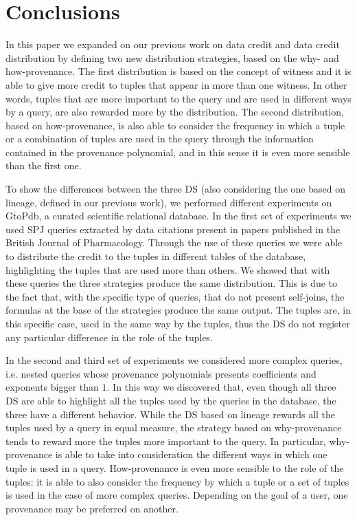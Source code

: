 \section{Conclusions}
\label{section:conclusions}

In this paper we expanded on our previous work on data credit and data credit distribution by defining two new distribution strategies, based on the why- and how-provenance. 
The first distribution is based on the concept of witness and it is able to give more credit to tuples that appear in more than one witness. 
In other words, tuples that are more important to the query and are used in different ways by a query, are also rewarded more by the distribution.
The second distribution, based on how-provenance, is also able to consider the frequency in which a tuple or a combination of tuples are used in the query through the information contained in the provenance polynomial, and in this sense it is even more sensible than the first one.

To show the differences between the three DS (also considering the one based on lineage, defined in our previous work), we performed different experiments on GtoPdb, a curated scientific relational database. 
In the first set of experiments we used SPJ queries extracted by data citations present in papers published in the British Journal of Pharmacology. 
Through the use of these queries we were able to distribute the credit to the tuples in different tables of the database, highlighting the tuples that are used more than others. 
We showed that with these queries the three strategies produce the same distribution. This is due to the fact that, with the specific type of queries, that do not present self-joins, the formulas at the base of the strategies produce the same output. The tuples are, in this specific case, used in the same way by the tuples, thus the DS do not register any particular difference in the role of the tuples.

In the second and third set of experiments we considered more complex queries, i.e. nested queries whose provenance polynomials presents coefficients and exponents bigger than $1$.
In this way we discovered that, even though all three DS are able to highlight all the tuples used by the queries in the database, the three have a different behavior. 
While the DS based on lineage rewards all the tuples used by a query in equal measure, the strategy based on why-provenance tends to reward more the tuples more important to the query. 
In particular, why-provenance is able to take into consideration the different ways in which one tuple is used in a query.  
How-provenance is even more sensible to the role of the tuples: it is able to also consider the frequency by which a tuple or a set of tuples is used in the case of more complex queries. Depending on the goal of a user, one provenance may be preferred on another. 

